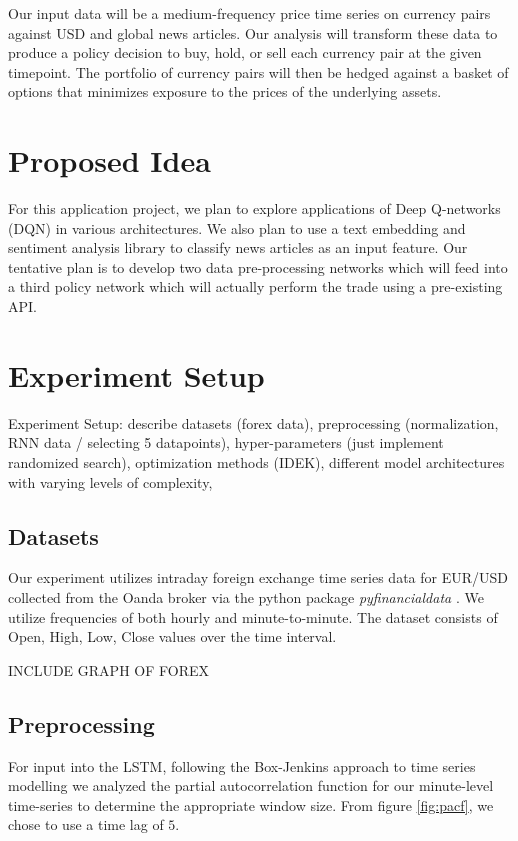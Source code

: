 \documentclass{article}
\begin{document}
Our input data will be a medium-frequency price time series on currency pairs against USD and global news articles. Our analysis will transform these data to produce a policy decision to buy, hold, or sell each currency pair at the given timepoint. The portfolio of currency pairs will then be hedged against a basket of options that minimizes exposure to the prices of the underlying assets.

\section{Proposed Idea}
For this application project, we plan to explore applications of Deep Q-networks (DQN) in various architectures. We also plan to use a text embedding and sentiment analysis library to classify news articles as an input feature. Our tentative plan is to develop two data pre-processing networks which will feed into a third policy network which will actually perform the trade using a pre-existing API.

\section{Experiment Setup}
 Experiment Setup: describe datasets (forex data), preprocessing (normalization, RNN data / selecting 5 datapoints), hyper-parameters (just implement randomized search), optimization methods (IDEK), different model architectures with varying levels of complexity, 





\subsection{Datasets}

Our experiment utilizes intraday foreign exchange time series data for EUR/USD collected from the Oanda broker via the python package \textit{pyfinancialdata} \cite{williams:20}. We utilize frequencies of both hourly and minute-to-minute. The dataset consists of Open, High, Low, Close values over the time interval.

INCLUDE GRAPH OF FOREX

\subsection{Preprocessing}

For input into the LSTM, following the Box-Jenkins approach to time series modelling we analyzed the partial autocorrelation function for our minute-level time-series to determine the appropriate window size. From figure \ref{fig:pacf}, we chose to use a time lag of $ 5 $. 
\end{document}

